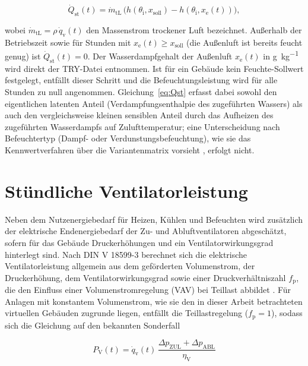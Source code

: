 \documentclass{scrreprt}
\begin{document}
\begin{equation}\label{eq:Qst}
    \dot Q_{\mathrm{st}}(t) = \dot m_{\mathrm{tL}} \, \bigl(h(\theta_{\mathrm{i}}, x_{\mathrm{soll}}) - h(\theta_{\mathrm{i}}, x_{\mathrm{e}}(t))\bigr),
\end{equation}

wobei $\dot m_{\mathrm{tL}} = \rho \, \dot q_{\mathrm{v}}(t)$ den
Massenstrom trockener Luft bezeichnet. Außerhalb der Betriebszeit
sowie für Stunden mit $x_{\mathrm{e}}(t) \geq x_{\mathrm{soll}}$ (die
Außenluft ist bereits feucht genug) ist $\dot Q_{\mathrm{st}}(t) = 0$.
Der Wasserdampfgehalt der Außenluft $x_{\mathrm{e}}(t)$ in \si{\gram\per\kilo\gram} wird direkt der
\ac{TRY}-Datei entnommen. Ist für ein Gebäude kein Feuchte-Sollwert
festgelegt, entfällt dieser Schritt und die Befeuchtungsleistung wird
für alle Stunden zu null angenommen. Gleichung~\eqref{eq:Qst} erfasst
dabei sowohl den eigentlichen latenten Anteil (Verdampfungsenthalpie
des zugeführten Wassers) als auch den vergleichsweise kleinen
sensiblen Anteil durch das Aufheizen des zugeführten Wasserdampfs auf
Zulufttemperatur; eine Unterscheidung nach Befeuchtertyp (Dampf- oder
Verdunstungsbefeuchtung), wie sie das Kennwertverfahren über die
Variantenmatrix vorsieht \parencite{DIN185993}, erfolgt nicht.



\section{Stündliche Ventilatorleistung}
Neben dem Nutzenergiebedarf für Heizen, Kühlen und Befeuchten wird
zusätzlich der elektrische Endenergiebedarf der Zu- und
Abluftventilatoren abgeschätzt, sofern für das Gebäude Druckerhöhungen
und ein Ventilatorwirkungsgrad hinterlegt sind. Nach DIN V 18599-3
berechnet sich die elektrische Ventilatorleistung allgemein aus dem
geförderten Volumenstrom, der Druckerhöhung, dem Ventilatorwirkungsgrad
sowie einer Druckverhältniszahl $f_{\mathrm{p}}$, die den Einfluss
einer Volumenstromregelung (\ac{VAV}) bei Teillast abbildet
\parencite{DIN185993}. Für Anlagen mit konstantem Volumenstrom, wie sie
den in dieser Arbeit betrachteten virtuellen Gebäuden zugrunde liegen,
entfällt die Teillastregelung ($f_{\mathrm{p}}=1$), sodass sich die
Gleichung auf den bekannten Sonderfall

\begin{equation}\label{eq:PV}
    P_{\mathrm{V}}(t) = \dot q_{\mathrm{v}}(t) \, \frac{\Delta p_{\mathrm{ZUL}} + \Delta p_{\mathrm{ABL}}}{\eta_{\mathrm{V}}}
\end{equation}
\end{document}
